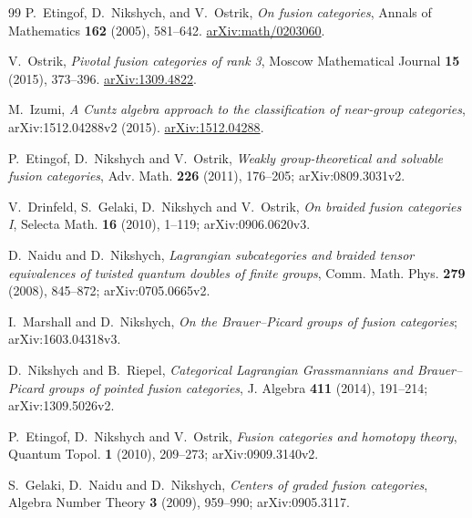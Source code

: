 \documentclass[11pt,a4paper]{article}
\begin{document}
\begin{thebibliography}{99}
P.~Etingof, D.~Nikshych, and V.~Ostrik,
\emph{On fusion categories},
Annals of Mathematics \textbf{162} (2005), 581--642.
\href{https://arxiv.org/abs/math/0203060}{arXiv:math/0203060}.


V.~Ostrik,
\emph{Pivotal fusion categories of rank 3},
Moscow Mathematical Journal \textbf{15} (2015), 373--396.
\href{https://arxiv.org/abs/1309.4822}{arXiv:1309.4822}.


M.~Izumi,
\emph{A Cuntz algebra approach to the classification of near-group categories},
arXiv:1512.04288v2 (2015).
\href{https://arxiv.org/abs/1512.04288}{arXiv:1512.04288}.


P.~Etingof, D.~Nikshych and V.~Ostrik,
\emph{Weakly group-theoretical and solvable fusion categories},
Adv. Math. \textbf{226} (2011), 176--205;
arXiv:0809.3031v2.


V.~Drinfeld, S.~Gelaki, D.~Nikshych and V.~Ostrik,
\emph{On braided fusion categories I},
Selecta Math. \textbf{16} (2010), 1--119;
arXiv:0906.0620v3.


D.~Naidu and D.~Nikshych,
\emph{Lagrangian subcategories and braided tensor equivalences of twisted
quantum doubles of finite groups},
Comm. Math. Phys. \textbf{279} (2008), 845--872;
arXiv:0705.0665v2.


I.~Marshall and D.~Nikshych,
\emph{On the Brauer--Picard groups of fusion categories};
arXiv:1603.04318v3.


D.~Nikshych and B.~Riepel,
\emph{Categorical Lagrangian Grassmannians and Brauer--Picard groups of
pointed fusion categories},
J. Algebra \textbf{411} (2014), 191--214;
arXiv:1309.5026v2.


P.~Etingof, D.~Nikshych and V.~Ostrik,
\emph{Fusion categories and homotopy theory},
Quantum Topol. \textbf{1} (2010), 209--273;
arXiv:0909.3140v2.


S.~Gelaki, D.~Naidu and D.~Nikshych,
\emph{Centers of graded fusion categories},
Algebra Number Theory \textbf{3} (2009), 959--990;
arXiv:0905.3117.

\end{thebibliography}
\end{document}
